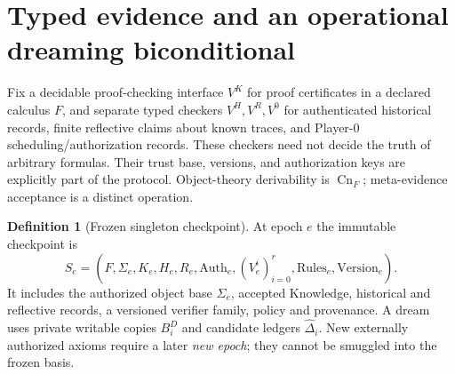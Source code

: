 \documentclass[11pt,letterpaper]{article}
\theoremstyle{definition}
\newtheorem{definition}{Definition}[section]
\theoremstyle{plain}
\theoremstyle{definition}
\newcommand{\Cn}{\operatorname{Cn}}
\begin{document}
\begin{center}
\end{center}

\section{Typed evidence and an operational dreaming biconditional}\label{gl-first-W0-s2}
Fix a decidable proof-checking interface $V^K$ for proof certificates in a declared calculus $F$, and separate typed checkers $V^H,V^R,V^0$ for authenticated historical records, finite reflective claims about known traces, and Player-0 scheduling/authorization records. These checkers need not decide the truth of arbitrary formulas. Their trust base, versions, and authorization keys are explicitly part of the protocol. Object-theory derivability is $\Cn_F$; meta-evidence acceptance is a distinct operation.

\begin{definition}[Frozen singleton checkpoint]
At epoch $e$ the immutable checkpoint is
\[
 S_e=(F,\Sigma_e,K_e,H_e,R_e,\mathrm{Auth}_e,(V^i_e)_{i=0}^r,\mathrm{Rules}_e,\mathrm{Version}_e).
\]
It includes the authorized object base $\Sigma_e$, accepted Knowledge, historical and reflective records, a versioned verifier family, policy and provenance. A dream uses private writable copies $B_i^D$ and candidate ledgers $\widehat\Delta_i$. New externally authorized axioms require a later \emph{new epoch}; they cannot be smuggled into the frozen basis.
\end{definition}
\end{document}
